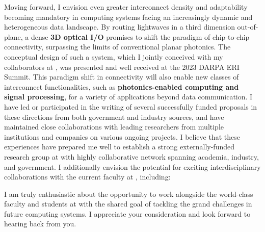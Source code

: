 Moving forward, I envision even greater interconnect density and adaptability becoming mandatory in computing systems facing an increasingly dynamic and heterogeneous data landscape. By routing lightwaves in a third dimension out-of-plane, a dense \textbf{3D optical I/O} promises to shift the paradigm of chip-to-chip connectivity, surpassing the limits of conventional planar photonics. The conceptual design of such a system, which I jointly conceived with my collaborators at \mySchoolShort{}, was presented and well received at the 2023 DARPA ERI Summit. This paradigm shift in connectivity will also enable new classes of interconnect functionalities, such as \textbf{photonics-enabled computing and signal processing}, for a variety of applications beyond data communication. I have led or participated in the writing of several successfully funded proposals in these directions from both government and industry sources, and have maintained close collaborations with leading researchers from multiple institutions and companies on various ongoing projects. I believe that these experiences have prepared me well to establish a strong externally-funded research group at \appSchoolDeptShort{} with highly collaborative network spanning academia, industry, and government. I additionally envision the potential for exciting interdisciplinary collaborations with the current faculty at \appSchoolShort{}, including:
\begin{enumerate*}[label=(\roman*)]
    \appCollab{}
\end{enumerate*}

I am truly enthusiastic about the opportunity to work alongside the world-class faculty and students at \appSchoolDeptShort{} with the shared goal of tackling the grand challenges in future computing systems. I appreciate your consideration and look forward to hearing back from you.
